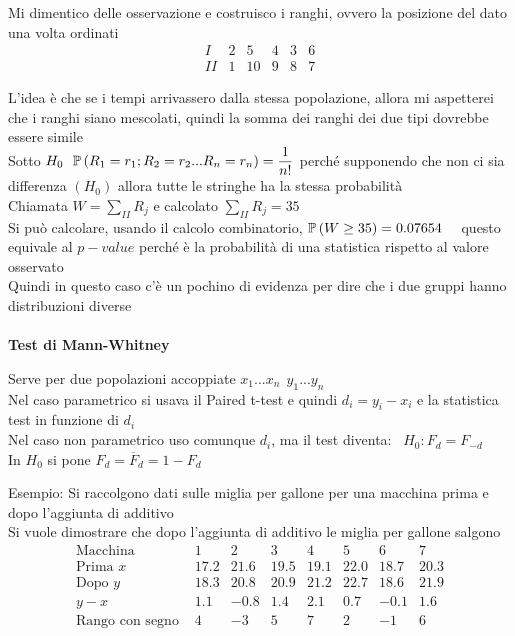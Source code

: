 Mi dimentico delle osservazione e costruisco i ranghi, ovvero la posizione del dato una volta ordinati
\[
\begin{array}{c|c|c|c|c|c}
    I & 2 & 5 & 4 & 3 & 6  \\
    \hline
    II & 1 & 10 & 9 & 8 & 7
\end{array}
\]

L'idea è che se i tempi arrivassero dalla stessa popolazione, allora mi aspetterei che i ranghi siano mescolati, quindi la somma dei ranghi dei due tipi dovrebbe essere simile\\

Sotto $H_0 \ \ \mathbb{P} \left( R_1=r_1; R_2=r_2 ... R_n=r_n \right)=\dfrac{1}{n!}$ perché supponendo che non ci sia differenza $(H_0)$ allora tutte le stringhe ha la stessa probabilità\\
Chiamata $W=\sum_{II} R_j$ e calcolato $\sum_{II}R_j=35$\\
Si può calcolare, usando il calcolo combinatorio, $\mathbb{P} \left( W\ge35 \right)=0.07654$ \ \ questo equivale al $p-value$ perché è la probabilità di una statistica rispetto al valore osservato\\
Quindi in questo caso c'è un pochino di evidenza per dire che i due gruppi hanno distribuzioni diverse\\ \\


\textbf{Test di Mann-Whitney}



Serve per due popolazioni accoppiate $x_1...x_n \ \ y_1...y_n$ \\
Nel caso parametrico si usava il Paired t-test e quindi $d_i=y_i-x_i$ e la statistica test in funzione di $d_i$\\
Nel caso non parametrico uso comunque $d_i$, ma il test diventa: \ $H_0 : F_d = F_{-d}$\\
In $H_0$ si pone $F_d =\overline{F}_d = 1- F_d$

Esempio:
Si raccolgono dati sulle miglia per gallone per una macchina prima e dopo l'aggiunta di additivo\\
Si vuole dimostrare che dopo l'aggiunta di additivo le miglia per gallone salgono
\[
\begin{array}{c|c|c|c|c|c|c|c}
    \text{Macchina} & 1 &2&3&4&5&6&7  \\
    \hline
    \text{Prima } x & 17.2 & 21.6 & 19.5 & 19.1 & 22.0 & 18.7 & 20.3 \\
    \hline
    \text{Dopo } y & 18.3 & 20.8 & 20.9 & 21.2 & 22.7 & 18.6 & 21.9 \\
    \hline
    y-x & 1.1 & -0.8 & 1.4 & 2.1 & 0.7 & -0.1 & 1.6\\
    \hline
    \text{Rango con segno } & 4 & -3 & 5 & 7 & 2 & -1 & 6
\end{array}
\]

